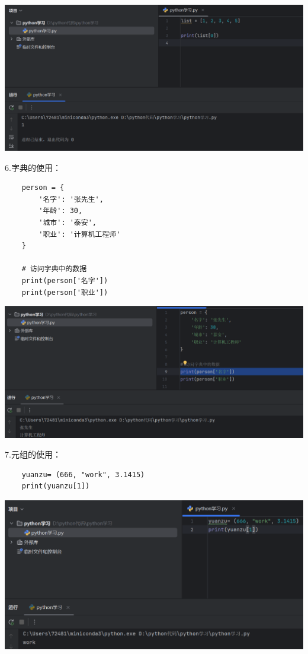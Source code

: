 \documentclass{article}
\begin{document}
\noindent
\begin{minipage}{\linewidth}
 \centering
  \includegraphics[width=0.5\linewidth]{python5.png}
  \label{fig:example}
\end{minipage}

6.字典的使用：
\begin{verbatim}
    person = {
        '名字': '张先生',
        '年龄': 30,
        '城市': '泰安',
        '职业': '计算机工程师'
    }
    
    # 访问字典中的数据
    print(person['名字'])  
    print(person['职业'])
\end{verbatim}



\noindent
\begin{minipage}{\linewidth}
 \centering
  \includegraphics[width=0.5\linewidth]{python6.png}
  \label{fig:example}
\end{minipage}

7.元组的使用：
\begin{verbatim}
    yuanzu= (666, "work", 3.1415)
    print(yuanzu[1])
\end{verbatim}


\noindent
\begin{minipage}{\linewidth}
 \centering
  \includegraphics[width=0.5\linewidth]{python7.png}
  \label{fig:example}
\end{minipage}
\end{document}
